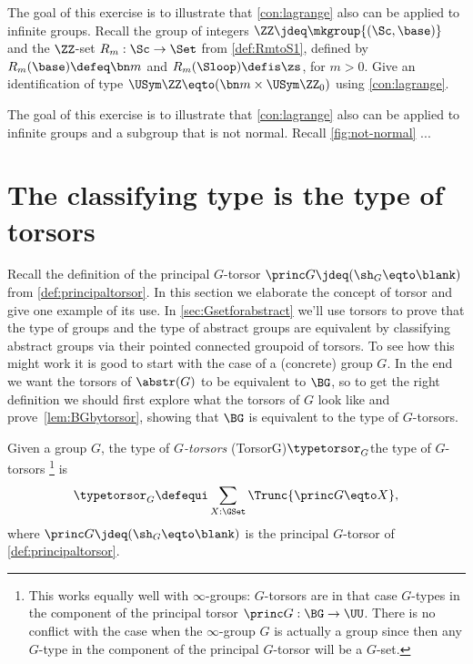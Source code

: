 \begin{xca}\label{xca:lagrange-Z-action-Rm}
The goal of this exercise is to illustrate that \cref{con:lagrange}
also can be applied to infinite groups. 
Recall the group of integers $\ZZ\jdeq\mkgroup{(\Sc,\base)}$ and the $\ZZ$-set
$R_m: \Sc\to\Set$ from \cref{def:RmtoS1}, defined by $R_m(\base) \defeq \bn m$
and $R_m(\Sloop) \defis \zs$, for $m>0$. Give an identification of type
$\USym\ZZ \eqto (\bn m \times \USym\ZZ_0)$ using \cref{con:lagrange}.
\end{xca}

\begin{xca}\label{xca:lagrange-if-subgr-not-normal}
The goal of this exercise is to illustrate that \cref{con:lagrange}
also can be applied to infinite groups and a subgroup that is not normal.
Recall \cref{fig:not-normal} ...
\end{xca}






\section{The classifying type is the type of torsors}
\label{sec:torsors}
Recall the definition of the principal $G$-torsor 
$\princ G \jdeq (\sh_G \eqto \blank)$ from \cref{def:principaltorsor}.
In this section we elaborate the concept of torsor and give one example
of its use.
In \cref{sec:Gsetforabstract} we'll use torsors to prove that the type of groups and the type of abstract groups are equivalent by classifying abstract groups via their pointed connected groupoid of torsors.  To see how this might work it is good to start with the case of a (concrete) group $G$.
In the end we want the torsors of $\abstr(G)$ to be equivalent to $\BG$, so to get the right definition we should first explore what the torsors of $G$ look like and prove~\cref{lem:BGbytorsor}, showing that $\BG$ is equivalent to the type of $G$-torsors.
\begin{definition}\label{def:Gtorsor}
  Given a group $G$, the type of \emph{$G$-torsors}%
  \glossary(TorsorG){$\protect\typetorsor_G$}{the type of $G$-torsors}%
  \footnote{This works equally well with $\infty$-groups: $G$-torsors are in that case $G$-types in the component of the principal torsor $\princ G:\BG\to\UU$. There is no conflict with the case when the $\infty$-group $G$ is actually a group since then any $G$-type in the component of the principal $G$-torsor will be a $G$-set.}
  is
  \[
    \typetorsor_G\defequi\sum_{X:\GSet}\Trunc{\princ G \eqto X},
  \]
  where $\princ G \jdeq (\sh_G \eqto \blank)$ is the 
  principal $G$-torsor of \cref{def:principaltorsor}.
\end{definition}

